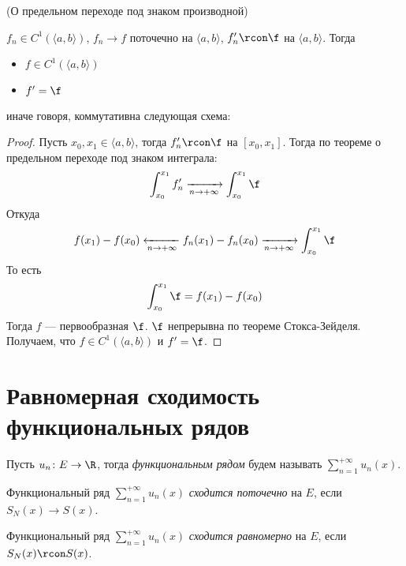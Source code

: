 \begin{theorem}(О предельном переходе под знаком производной)

    $f_n \in C^1(\langle a, b \rangle)$, $f_n \to f$ поточечно на $\langle a, b
    \rangle$, $f'_n \rcon \f$ на $\langle a, b \rangle$. Тогда
    \begin{itemize}
        \item $f \in C^1(\langle a, b \rangle)$
        \item $f' = \f$
    \end{itemize}
    иначе говоря, коммутативна следующая схема:

\end{theorem}
\begin{proof}
    Пусть $x_0, x_1 \in \langle a, b \rangle$, тогда $f'_n \rcon \f$
    на $[x_0, x_1]$. Тогда по теореме о предельном переходе под
    знаком интеграла:
\[
    \int_{x_0}^{x_1}{f'_n} \xrightarrow[n \to +\infty]{}
    \int_{x_0}^{x_1}{\f}
\]
    Откуда
\[
    f(x_1) - f(x_0) \xleftarrow[n \to +\infty]{} f_n(x_1) - f_n(x_0)
    \xrightarrow[n \to +\infty]{} \int_{x_0}^{x_1}{\f}
\]
    То есть
\[
    \int_{x_0}^{x_1}{\f} = f(x_1) - f(x_0)
\]
    Тогда $f$ --- первообразная $\f$. $\f$ непрерывна по теореме
    Стокса-Зейделя. Получаем, что $f \in C^1(\langle a, b \rangle)$ и $f' = \f$.
\end{proof}

\newpage
\section{Равномерная сходимость функциональных рядов}

\begin{definition}
    Пусть $u_n \colon E \to \R$, тогда \textit{функциональным рядом} будем
    называть $\displaystyle \sum_{n = 1}^{+\infty}{u_n(x)}$.
\end{definition}

\begin{definition}
    Функциональный ряд $\displaystyle \sum_{n = 1}^{+\infty}{u_n(x)}$
    \textit{сходится поточечно} на $E$, если \\ $S_N(x) \to S(x)$.
\end{definition}

\begin{definition}
    Функциональный ряд $\displaystyle \sum_{n = 1}^{+\infty}{u_n(x)}$
    \textit{сходится равномерно} на $E$, если \\ $S_N(x) \rcon S(x)$.
\end{definition}

